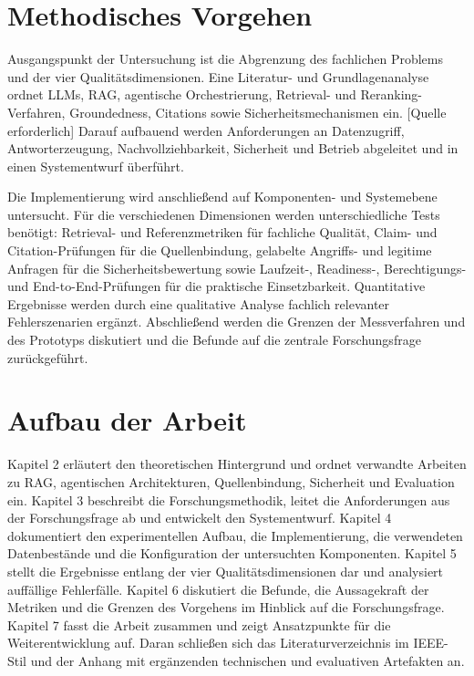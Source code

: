 \section{Methodisches Vorgehen}

Ausgangspunkt der Untersuchung ist die Abgrenzung des fachlichen Problems und der vier Qualitätsdimensionen. Eine Literatur- und Grundlagenanalyse ordnet LLMs, RAG, agentische Orchestrierung, Retrieval- und Reranking-Verfahren, Groundedness, Citations sowie Sicherheitsmechanismen ein. [Quelle erforderlich] Darauf aufbauend werden Anforderungen an Datenzugriff, Antworterzeugung, Nachvollziehbarkeit, Sicherheit und Betrieb abgeleitet und in einen Systementwurf überführt.

Die Implementierung wird anschließend auf Komponenten- und Systemebene untersucht. Für die verschiedenen Dimensionen werden unterschiedliche Tests benötigt: Retrieval- und Referenzmetriken für fachliche Qualität, Claim- und Citation-Prüfungen für die Quellenbindung, gelabelte Angriffs- und legitime Anfragen für die Sicherheitsbewertung sowie Laufzeit-, Readiness-, Berechtigungs- und End-to-End-Prüfungen für die praktische Einsetzbarkeit. Quantitative Ergebnisse werden durch eine qualitative Analyse fachlich relevanter Fehlerszenarien ergänzt. Abschließend werden die Grenzen der Messverfahren und des Prototyps diskutiert und die Befunde auf die zentrale Forschungsfrage zurückgeführt.

\section{Aufbau der Arbeit}

Kapitel 2 erläutert den theoretischen Hintergrund und ordnet verwandte Arbeiten zu RAG, agentischen Architekturen, Quellenbindung, Sicherheit und Evaluation ein. Kapitel 3 beschreibt die Forschungsmethodik, leitet die Anforderungen aus der Forschungsfrage ab und entwickelt den Systementwurf. Kapitel 4 dokumentiert den experimentellen Aufbau, die Implementierung, die verwendeten Datenbestände und die Konfiguration der untersuchten Komponenten. Kapitel 5 stellt die Ergebnisse entlang der vier Qualitätsdimensionen dar und analysiert auffällige Fehlerfälle. Kapitel 6 diskutiert die Befunde, die Aussagekraft der Metriken und die Grenzen des Vorgehens im Hinblick auf die Forschungsfrage. Kapitel 7 fasst die Arbeit zusammen und zeigt Ansatzpunkte für die Weiterentwicklung auf. Daran schließen sich das Literaturverzeichnis im IEEE-Stil und der Anhang mit ergänzenden technischen und evaluativen Artefakten an.
